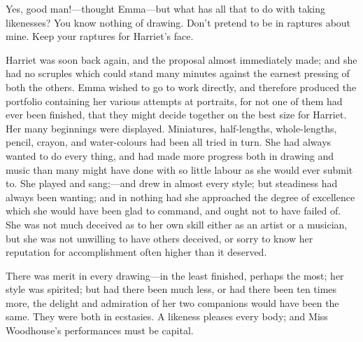 Yes, good man!---thought Emma---but what has all that to do with taking likenesses? You know nothing of drawing. Don't pretend to be in raptures about mine. Keep your raptures for Harriet's face. 




Harriet was soon back again, and the proposal almost immediately made; and she had no scruples which could stand many minutes against the earnest pressing of both the others. Emma wished to go to work directly, and therefore produced the portfolio containing her various attempts at portraits, for not one of them had ever been finished, that they might decide together on the best size for Harriet. Her many beginnings were displayed. Miniatures, half-lengths, whole-lengths, pencil, crayon, and water-colours had been all tried in turn. She had always wanted to do every thing, and had made more progress both in drawing and music than many might have done with so little labour as she would ever submit to. She played and sang;---and drew in almost every style; but steadiness had always been wanting; and in nothing had she approached the degree of excellence which she would have been glad to command, and ought not to have failed of. She was not much deceived as to her own skill either as an artist or a musician, but she was not unwilling to have others deceived, or sorry to know her reputation for accomplishment often higher than it deserved.

There was merit in every drawing---in the least finished, perhaps the most; her style was spirited; but had there been much less, or had there been ten times more, the delight and admiration of her two companions would have been the same. They were both in ecstasies. A likeness pleases every body; and Miss Woodhouse's performances must be capital.

